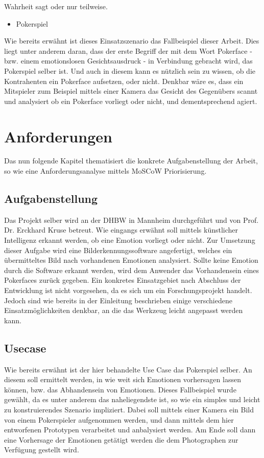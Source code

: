 \documentclass[12pt, a4paper]{report}
\begin{document}
Wahrheit sagt oder nur teilweise.
\begin{itemize}
	\item{Pokerspiel}
\end{itemize}
Wie bereits erwähnt ist dieses Einsatzszenario das Fallbeispiel dieser Arbeit. Dies liegt unter anderem daran, dass der erste Begriff der mit dem Wort Pokerface - bzw. einem emotionslosen Gesichtsausdruck -  in Verbindung gebracht wird, das Pokerspiel selber ist. 
Und auch in diesem kann es nützlich sein zu wissen, ob die Kontrahenten ein Pokerface aufsetzen, oder nicht. 
Denkbar wäre es, dass ein Mitspieler zum Beispiel mittels einer Kamera das Gesicht des Gegenübers scannt und analysiert ob ein Pokerface vorliegt oder nicht, und dementsprechend agiert.

\chapter{Anforderungen}
Das nun folgende Kapitel thematisiert die konkrete Aufgabenstellung der Arbeit, so wie eine Anforderungsanalyse mittels MoSCoW Priorisierung. 
\section{Aufgabenstellung}
Das Projekt selber wird an der DHBW in Mannheim durchgeführt und von Prof. Dr. Erckhard Kruse betreut.
Wie eingangs erwähnt soll mittels künstlicher Intelligenz erkannt werden, ob eine Emotion vorliegt oder nicht.
Zur Umsetzung dieser Aufgabe wird eine Bilderkennungssoftware angefertigt, welches ein übermitteltes Bild nach vorhandenen Emotionen analysiert. Sollte keine Emotion durch die Software erkannt werden, wird dem Anwender das Vorhandensein eines Pokerfaces zurück gegeben. Ein konkretes Einsatzgebiet nach Abschluss der Entwicklung ist nicht
vorgesehen, da es sich um ein Forschungsprojekt handelt. Jedoch sind wie bereits in der Einleitung beschrieben einige verschiedene Einsatzmöglichkeiten denkbar, an die das Werkzeug leicht angepasst werden kann.

\section{Usecase}
Wie bereits erwähnt ist der hier behandelte Use Case das Pokerspiel selber. An diesem soll ermittelt werden, in wie weit sich Emotionen vorhersagen lassen können, bzw. das Abhandensein von Emotionen. Dieses Fallbeispiel wurde gewählt, da es unter anderem das naheliegendste ist, so wie ein simples und leicht zu konstruierendes Szenario impliziert. Dabei soll mittels einer Kamera ein Bild von einem Pokerspieler aufgenommen werden, und dann mittels dem hier entworfenen Prototypen verarbeitet und anbalysiert werden. Am Ende soll dann eine Vorhersage der Emotionen getätigt werden die dem Photographen zur Verfügung gestellt wird.
\end{document}
